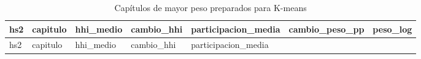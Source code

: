 \documentclass[
]{article}
\begin{document}
\begin{longtable}[]{@{}
  >{\raggedright\arraybackslash}p{}
  >{\raggedright\arraybackslash}p{}
  >{\raggedleft\arraybackslash}p{}
  >{\raggedleft\arraybackslash}p{}
  >{\raggedleft\arraybackslash}p{}
  >{\raggedleft\arraybackslash}p{}
  >{\raggedleft\arraybackslash}p{}@{}}
\caption{Capítulos de mayor peso preparados para K-means}\tabularnewline
\toprule\noalign{}
\begin{minipage}[b]{\linewidth}\raggedright
hs2
\end{minipage} & \begin{minipage}[b]{\linewidth}\raggedright
capitulo
\end{minipage} & \begin{minipage}[b]{\linewidth}\raggedleft
hhi\_medio
\end{minipage} & \begin{minipage}[b]{\linewidth}\raggedleft
cambio\_hhi
\end{minipage} & \begin{minipage}[b]{\linewidth}\raggedleft
participacion\_media
\end{minipage} & \begin{minipage}[b]{\linewidth}\raggedleft
cambio\_peso\_pp
\end{minipage} & \begin{minipage}[b]{\linewidth}\raggedleft
peso\_log
\end{minipage} \\
\midrule\noalign{}
\endfirsthead
\toprule\noalign{}
\begin{minipage}[b]{\linewidth}\raggedright
hs2
\end{minipage} & \begin{minipage}[b]{\linewidth}\raggedright
capitulo
\end{minipage} & \begin{minipage}[b]{\linewidth}\raggedleft
hhi\_medio
\end{minipage} & \begin{minipage}[b]{\linewidth}\raggedleft
cambio\_hhi
\end{minipage} & \begin{minipage}[b]{\linewidth}\raggedleft
participacion\_media
\end{minipage} & \begin{minipage}[b]{\linewidth}\raggedleft

\end{minipage}
\end{longtable}
\end{document}
